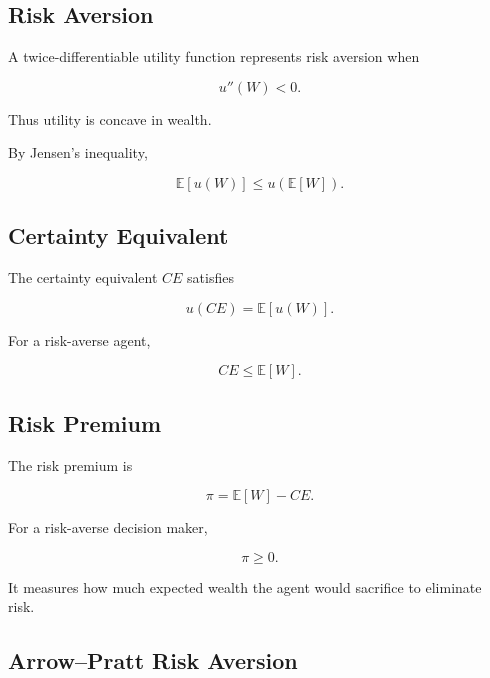 \subsection{Risk Aversion}
\label{subsec:risk-aversion}

A twice-differentiable utility function represents risk aversion when

\[
\boxed{
u''(W)<0.
}
\]

Thus utility is concave in wealth.

By Jensen's inequality,

\[
\boxed{
\mathbb{E}[u(W)]
\leq
u(\mathbb{E}[W]).
}
\]

\subsection{Certainty Equivalent}
\label{subsec:certainty-equivalent}

The certainty equivalent \(CE\) satisfies

\[
\boxed{
u(CE)
=
\mathbb{E}[u(W)].
}
\]

For a risk-averse agent,

\[
\boxed{
CE
\leq
\mathbb{E}[W].
}
\]

\subsection{Risk Premium}
\label{subsec:risk-premium-economics}

The risk premium is

\[
\boxed{
\pi
=
\mathbb{E}[W]-CE.
}
\]

For a risk-averse decision maker,

\[
\boxed{
\pi\geq0.
}
\]

It measures how much expected wealth the agent would sacrifice to eliminate
risk.

\subsection{Arrow--Pratt Risk Aversion}
\label{subsec:arrow-pratt}

